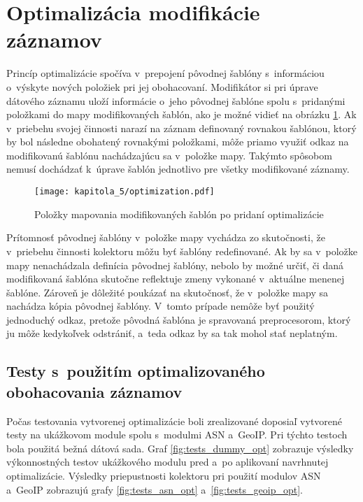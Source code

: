 \section{Optimalizácia modifikácie záznamov}

Princíp optimalizácie spočíva v~prepojení pôvodnej šablóny s~informáciou o~výskyte nových položiek pri jej obohacovaní. Modifikátor si pri úprave dátového záznamu uloží informácie o~jeho pôvodnej šablóne spolu s~pridanými položkami do mapy
modifikovaných šablón, ako je možné vidieť na obrázku \ref{fig:optimization}. Ak v~priebehu svojej činnosti narazí na záznam definovaný rovnakou šablónou, ktorý by bol následne obohatený rovnakými položkami, môže priamo využiť odkaz na
modifikovanú šablónu nachádzajúcu sa v~položke mapy. Takýmto spôsobom nemusí dochádzať k~úprave šablón jednotlivo pre všetky modifikované záznamy.

\begin{figure}[ht]
    \centering
    \texttt{[image: kapitola\_5/optimization.pdf]}
    \caption{Položky mapovania modifikovaných šablón po pridaní optimalizácie}
    \label{fig:optimization}
\end{figure}

Prítomnosť pôvodnej šablóny v~položke mapy vychádza zo skutočnosti, že v~priebehu činnosti kolektoru môžu byť šablóny redefinované. Ak by sa v~položke mapy nenachádzala definícia pôvodnej šablóny, nebolo by možné určiť, či daná modifikovaná šablóna skutočne reflektuje zmeny vykonané
v~aktuálne menenej šablóne. Zároveň je dôležité poukázať na skutočnosť, že v~položke mapy sa nachádza kópia pôvodnej šablóny. V~tomto prípade nemôže byť použitý jednoduchý odkaz, pretože pôvodná šablóna je spravovaná preprocesorom, ktorý ju môže kedykoľvek
odstrániť, a~teda odkaz by sa tak mohol stať neplatným.

\subsection*{Testy s~použitím optimalizovaného obohacovania záznamov}

Počas testovania vytvorenej optimalizácie boli zrealizované doposiaľ vytvorené testy na ukážkovom module spolu s~modulmi ASN a~GeoIP. Pri týchto testoch bola použitá bežná dátová sada.
Graf \ref{fig:tests_dummy_opt} zobrazuje výsledky výkonnostných testov ukážkového modulu pred a~po aplikovaní navrhnutej optimalizácie. Výsledky priepustnosti kolektoru pri použití modulov ASN a~GeoIP zobrazujú grafy \ref{fig:tests_asn_opt} a~\ref{fig:tests_geoip_opt}.

